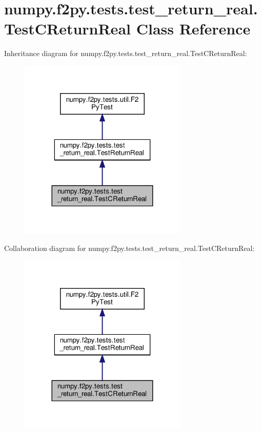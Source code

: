 \hypertarget{classnumpy_1_1f2py_1_1tests_1_1test__return__real_1_1TestCReturnReal}{}\section{numpy.\+f2py.\+tests.\+test\+\_\+return\+\_\+real.\+Test\+C\+Return\+Real Class Reference}
\label{classnumpy_1_1f2py_1_1tests_1_1test__return__real_1_1TestCReturnReal}


Inheritance diagram for numpy.\+f2py.\+tests.\+test\+\_\+return\+\_\+real.\+Test\+C\+Return\+Real\+:
\nopagebreak
\begin{figure}[H]
\begin{center}
\leavevmode
\includegraphics[width=227pt]{classnumpy_1_1f2py_1_1tests_1_1test__return__real_1_1TestCReturnReal__inherit__graph}
\end{center}
\end{figure}


Collaboration diagram for numpy.\+f2py.\+tests.\+test\+\_\+return\+\_\+real.\+Test\+C\+Return\+Real\+:
\nopagebreak
\begin{figure}[H]
\begin{center}
\leavevmode
\includegraphics[width=227pt]{classnumpy_1_1f2py_1_1tests_1_1test__return__real_1_1TestCReturnReal__coll__graph}
\end{center}
\end{figure}
